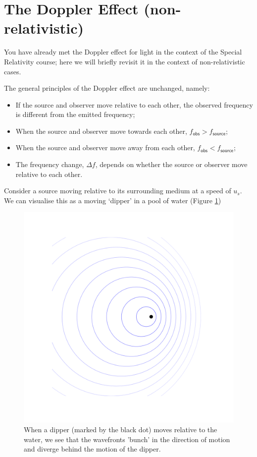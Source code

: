 \documentclass[
]{book}
\providecommand{\tightlist}{%
  \setlength{\itemsep}{0pt}\setlength{\parskip}{0pt}}
\begin{document}
\hypertarget{sec-ch9-dopplereffect1}{%
\section{The Doppler Effect (non-relativistic)}\label{sec-ch9-dopplereffect1}}

You have already met the Doppler effect for light in the context of the Special Relativity course; here we will briefly revisit it in the context of non-relativistic cases.

The general principles of the Doppler effect are unchanged, namely:

\begin{itemize}
\tightlist
\item
  If the source and observer move relative to each other, the observed frequency is different from the emitted frequency;
\item
  When the source and observer move towards each other, \(f_{\textsf{obs}} > f_{\textsf{source}}\);
\item
  When the source and observer move away from each other, \(f_{\textsf{obs}} < f_{\textsf{source}}\);
\item
  The frequency change, \(\Delta f\), depends on whether the source or observer move relative to each other.
\end{itemize}

Consider a source moving relative to its surrounding medium at a speed of \(u_s\). We can visualise this as a moving `dipper' in a pool of water (Figure \ref{fig:ch9-dopplerdipper1})

\begin{figure}

{\centering \includegraphics[width=0.7\linewidth]{visualisations/ch9-doppler1} 

}

\caption{When a dipper (marked by the black dot) moves relative to the water, we see that the wavefronts 'bunch' in the direction of motion and diverge behind the motion of the dipper.}\label{fig:ch9-dopplerdipper1}
\end{figure}
\end{document}
